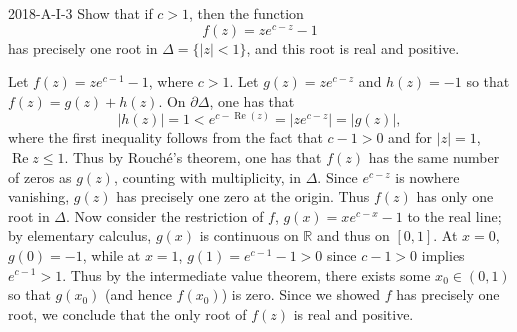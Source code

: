 \documentclass{article}
\begin{document}
	\begin{prb}{2018-A-I-3}
		Show that if $c > 1$, then the function 
		\begin{equation*}
			f(z)= ze^{c - z} -1
		\end{equation*}
		has precisely one root in $\Delta = \{|z| < 1\}$, and this root is real and positive. 
	\end{prb}
	Let $f(z) = ze^{c - 1} - 1$, where $c > 1$. Let $g(z) = ze^{c- z}$ and $h(z) = -1$ so that $f(z) = g(z) + h(z)$. On $\partial \Delta$, one has that 
	\begin{equation*}
		|h(z)| = 1 < e^{c - \operatorname{Re}(z)} = |ze^{c-z}| = |g(z)|, 
	\end{equation*}
	where the first inequality follows from the fact that $c - 1 > 0$ and for $|z| = 1$, $\operatorname{Re}{z} \leq 1$. Thus by Rouch\'e's theorem, one has that $f(z)$ has the same number of zeros as $g(z)$, counting with multiplicity, in $\Delta$. Since $e^{c - z}$ is nowhere vanishing, $g(z)$ has precisely one zero at the origin. Thus $f(z)$ has only one root in $\Delta$. Now consider the restriction of $f$, $g(x) = xe^{c - x} - 1$ to the real line; by elementary calculus, $g(x)$ is continuous on $\mathbb{R}$ and thus on $[0,1]$. At $x = 0$, $g(0) = -1$, while at $x = 1$, $g(1) = e^{c - 1} - 1 > 0$  since $c - 1 > 0$ implies $e^{c - 1} > 1$. Thus by the intermediate value theorem, there exists some $x_{0} \in (0,1)$ so that $g(x_{0})$ (and hence $f(x_{0})$) is zero. Since we showed $f$ has precisely one root, we conclude that the only root of $f(z)$ is real and positive. 
	
\end{document}
